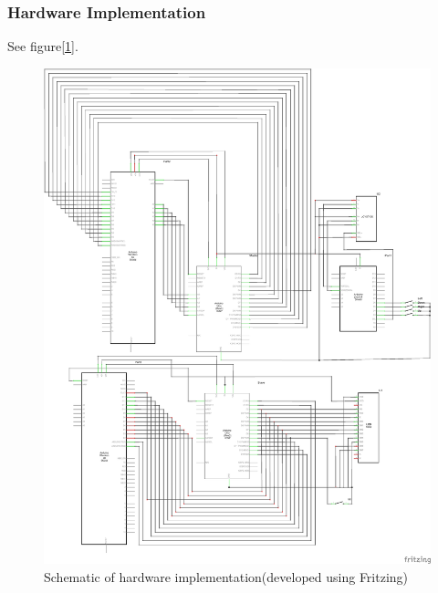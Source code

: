 \subsubsection{Hardware Implementation}
See figure[\ref{fig:schm}].
\begin{figure}[!htbp]
	\centering
	\includegraphics[width = \linewidth]{images/schem.png}
	\caption{Schematic of hardware implementation(developed using Fritzing)}
	\label{fig:schm}
\end{figure}

